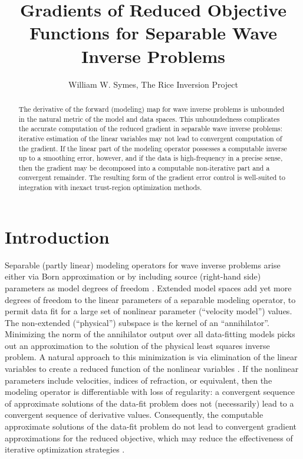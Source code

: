 \title{Gradients of Reduced Objective Functions for Separable Wave
  Inverse Problems}
\date{}
\author{William W. Symes, The Rice Inversion Project}
\maketitle
\parskip 12pt
\begin{abstract}
The derivative of the forward (modeling) map for wave inverse problems
is unbounded in the natural metric of the model and data spaces. This
unboundedness complicates the accurate computation of the reduced
gradient in separable wave inverse problems: iterative estimation of
the linear variables may not lead to convergent computation of the
gradient. If the linear part of the modeling operator possesses a computable
inverse up to a smoothing error, however, and if the data is
high-frequency in a precise sense, then the gradient may be decomposed
into a computable non-iterative part and a convergent remainder. 
The resulting form of the
gradient error control is well-suited to integration with inexact trust-region
optimization methods.

\end{abstract}

\section{Introduction}
Separable (partly linear) modeling operators for wave inverse problems
arise either via Born approximation
\cite[]{KerSy:94,ChaurisNoble:01,MuldertenKroode:01,
  ShenSymes:08,WeibullArntsen:13,BiondiAlmomin:14} or by including
source (right-hand side) parameters as model degrees of freedom
\cite[]{SongSymes:94b,Plessix:00,PrattSymes:02,LuoSava:11,Warner:14,LeeuwenHerrmannWRI:13}.
Extended model spaces add yet more degrees of freedom to the linear
parameters of a separable modeling operator, to permit data fit for a
large set of nonlinear parameter (``velocity model'') values. The
non-extended (``physical'') subspace is the kernel of an
``annihilator''. Minimizing the norm of the annihilator output over
all data-fitting models picks out an approximation to the solution of
the physical least squares inverse problem. A natural approach to this
minimization is via elimination of the linear variables to create a
reduced function of the nonlinear variables
\cite[]{KerSy:94,vanLeeuwenMulder:09,LiRickettAbubakar:13}. If the
nonlinear parameters include velocities, indices of refraction, or
equivalent, then the modeling operator is differentiable with loss of
regularity: a convergent sequence of approximate solutions of the
data-fit problem does not (necessarily) lead to a convergent sequence
of derivative values. Consequently, the computable approximate
solutions of the data-fit problem do not lead to convergent gradient
approximations for the reduced objective, which may reduce the
effectiveness of iterative optimization strategies
\cite[]{HuangSymes:SEG15}.

